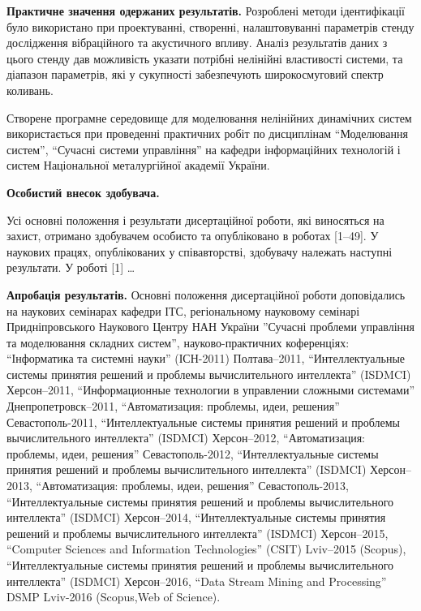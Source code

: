\documentclass[a4paper,13pt]{atuaref}
\begin{document}
\smallskip
\textbf{Практичне значення одержаних результатів.}
Розроблені методи ідентифікації було використано
при проектуванні, створенні, налаштовуванні параметрів
стенду дослідження вібраційного та акустичного впливу.
Аналіз результатів даних з цього стенду
дав можливість указати потрібні нелінійні властивості системи,
та діапазон параметрів, які у сукупності
забезпечують широкосмуговий спектр коливань.

Створене програмне середовище для моделювання нелінійних динамічних систем
використається при проведенні практичних робіт по дисциплінам
``Моделювання систем'',
``Сучасні системи управління'' на кафедри інформаційних технологій
і систем Національної металургійної академії України.


\smallskip
\textbf{Особистий внесок здобувача.}

Усі основні положення і результати
дисертаційної роботи, які виносяться на захист, отримано здобувачем особисто та
опубліковано в роботах [1--49]. У наукових працях, опублікованих у співавторстві,
здобувачу належать наступні результати. У роботі [1] \ldots



\smallskip
\textbf{Апробація результатів.}
Основні положення дисертаційної роботи доповідались на наукових
семінарах кафедри ІТС,
регіональному науковому семінарі Придніпровського Наукового Центру НАН України
''Сучасні проблеми управління та моделювання складних систем'',
науково-практичних коференціях:
``Інформатика та системні науки'' (ІСН-2011) Полтава--2011,
``Интеллектуальные системы принятия решений и проблемы вычислительного интеллекта'' (ISDMCI) Херсон--2011,
``Информационные технологии в управлении сложными системами'' Днепропетровск--2011,
``Автоматизация: проблемы, идеи, решения'' Севастополь-2011,
``Интеллектуальные системы принятия решений и проблемы вычислительного интеллекта'' (ISDMCI) Херсон--2012,
``Автоматизация: проблемы, идеи, решения'' Севастополь-2012,
``Интеллектуальные системы принятия решений и проблемы вычислительного интеллекта'' (ISDMCI) Херсон--2013,
``Автоматизация: проблемы, идеи, решения'' Севастополь-2013,
``Интеллектуальные системы принятия решений и проблемы вычислительного интеллекта'' (ISDMCI) Херсон--2014,
``Интеллектуальные системы принятия решений и проблемы вычислительного интеллекта'' (ISDMCI) Херсон--2015,
``Computer Sciences and Information Technologies'' (CSIT) Lviv--2015 (Scopus),
``Интеллектуальные системы принятия решений и проблемы вычислительного интеллекта'' (ISDMCI) Херсон--2016,
``Data Stream Mining and Processing'' DSMP Lviv-2016 (Scopus,Web of Science).
\end{document}
